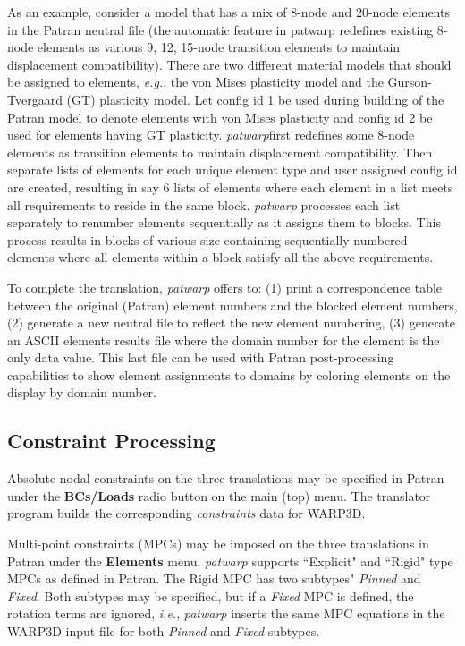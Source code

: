 \documentclass[11pt]{report}
\numberwithin{equation}{section}
\begin{document}
As an example, consider a model that has a mix of 8-node and 20-node elements in
the Patran neutral file (the automatic feature in patwarp redefines existing
8-node elements as various 9, 12, 15-node transition elements to maintain
displacement compatibility). There are two different material models that should
be assigned to elements, \textit{e.g.}, the von Mises plasticity model and the
Gurson-Tvergaard (GT) plasticity model. Let config id 1 be used during building
of the Patran model to denote elements with von Mises plasticity and config id 2
be used for elements having GT plasticity. \textit{patwarp}first redefines some 8-node
elements as transition elements to maintain displacement compatibility. Then
separate lists of elements for each unique element type and user assigned config
id are created, resulting in say 6 lists of elements where each element in a
list meets all requirements to reside in the same block. \textit{patwarp} processes each
list separately to renumber elements sequentially as it assigns them to blocks.
This process results in blocks of
various size containing sequentially numbered elements where all elements within
a block satisfy all the above requirements.


To complete the translation, \textit{patwarp} offers to: (1) print a correspondence table
between the original (Patran) element numbers and the blocked element numbers,
(2) generate a new neutral file to reflect the new element numbering, (3)
generate an ASCII elements results file where the domain number for the element
is the only data value. This last file can be used with Patran post-processing
capabilities to show element assignments to domains by coloring elements on the
display by domain number.

\subsection{Constraint Processing}
\noindent Absolute nodal constraints on the three translations may be specified in Patran
under the \textbf{BCs/Loads} radio button on the main (top) menu. The translator program
builds the corresponding \textit{constraints} data for WARP3D. 

Multi-point constraints (MPCs) may be imposed on the three translations in
Patran under the \textbf{Elements} menu. \textit{patwarp} supports 
``Explicit" and ``Rigid" type
MPCs as defined in Patran. The Rigid MPC has two subtypes" \textit{Pinned} 
and \textit{Fixed}.
Both subtypes may be specified, but if a \textit{Fixed} MPC is defined, the rotation
terms are ignored, \textit{i.e.}, \textit{patwarp} inserts the same MPC equations 
in the WARP3D input file for both \textit{Pinned} and \textit{Fixed} subtypes.
\end{document}
